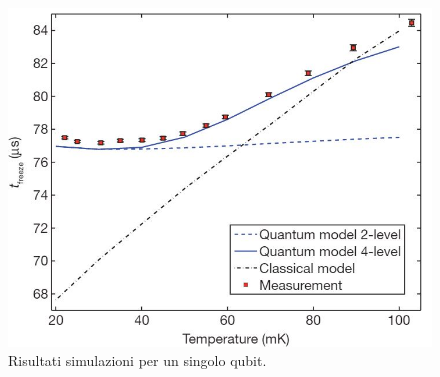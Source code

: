 \begin{figure}[htbp]
\centering
\includegraphics[scale=0.6]{Immagini/qa-qubit.jpg}
\caption{Risultati simulazioni per un singolo qubit.}
\label{figura:qa-qubit}
\end{figure}

